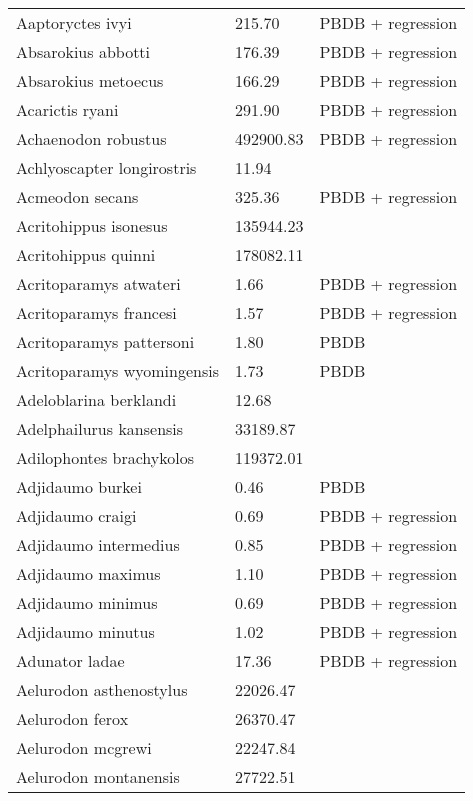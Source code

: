 \documentclass{article}
\begin{document}
\begin{center}
\begin{longtable}{p{} p{} p{}}
    \hline \hline
    \endlastfoot
    Aaptoryctes ivyi & 215.70 & PBDB + regression \\ 
    Absarokius abbotti & 176.39 & PBDB + regression \\ 
    Absarokius metoecus & 166.29 & PBDB + regression \\ 
    Acarictis ryani & 291.90 & PBDB + regression \\ 
    Achaenodon robustus & 492900.83 & PBDB + regression \\ 
    Achlyoscapter longirostris & 11.94 & \cite{Tomiya2013} \\ 
    Acmeodon secans & 325.36 & PBDB + regression \\ 
    Acritohippus isonesus & 135944.23 & \cite{Tomiya2013} \\ 
    Acritohippus quinni & 178082.11 & \cite{Tomiya2013} \\ 
    Acritoparamys atwateri & 1.66 & PBDB + regression \\ 
    Acritoparamys francesi & 1.57 & PBDB + regression \\ 
    Acritoparamys pattersoni & 1.80 & PBDB \\ 
    Acritoparamys wyomingensis & 1.73 & PBDB \\ 
    Adeloblarina berklandi & 12.68 & \cite{Tomiya2013} \\ 
    Adelphailurus kansensis & 33189.87 & \cite{Tomiya2013} \\ 
    Adilophontes brachykolos & 119372.01 & \cite{Tomiya2013} \\ 
    Adjidaumo burkei & 0.46 & PBDB \\ 
    Adjidaumo craigi & 0.69 & PBDB + regression \\ 
    Adjidaumo intermedius & 0.85 & PBDB + regression \\ 
    Adjidaumo maximus & 1.10 & PBDB + regression \\ 
    Adjidaumo minimus & 0.69 & PBDB + regression \\ 
    Adjidaumo minutus & 1.02 & PBDB + regression \\ 
    Adunator ladae & 17.36 & PBDB + regression \\ 
    Aelurodon asthenostylus & 22026.47 & \cite{Tomiya2013} \\ 
    Aelurodon ferox & 26370.47 & \cite{Tomiya2013} \\ 
    Aelurodon mcgrewi & 22247.84 & \cite{Tomiya2013} \\ 
    Aelurodon montanensis & 27722.51 & \cite{Tomiya2013} \\ 

\end{longtable}
\end{center}
\end{document}
